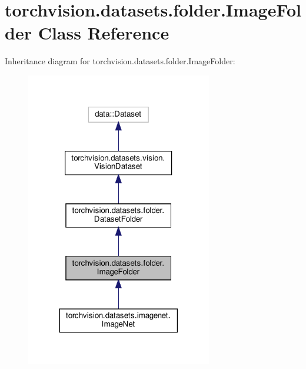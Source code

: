 \hypertarget{classtorchvision_1_1datasets_1_1folder_1_1ImageFolder}{}\section{torchvision.\+datasets.\+folder.\+Image\+Folder Class Reference}
\label{classtorchvision_1_1datasets_1_1folder_1_1ImageFolder}


Inheritance diagram for torchvision.\+datasets.\+folder.\+Image\+Folder\+:
\nopagebreak
\begin{figure}[H]
\begin{center}
\leavevmode
\includegraphics[width=230pt]{classtorchvision_1_1datasets_1_1folder_1_1ImageFolder__inherit__graph}
\end{center}
\end{figure}


